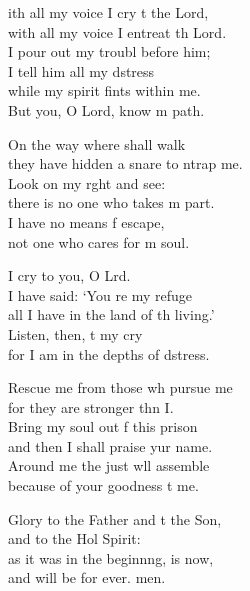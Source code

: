 \settowidth{\versewidth}{With all my voice I cry to the Lord, *}
\begin{psalmverse}%
  \begin{patverse}
ith all my voice I cry t the Lord,\Med\\
    with all my voice I entreat th Lord.\\
I pour out my troubl before him;\Med\\
    I tell him all my d\pointup{\i}stress\\
while my spirit fints within me.\Med\\
    But you, O Lord, know m path.

On the way where  shall walk\Med\\
    they have hidden a snare to ntrap me.\\
Look on my r\pointup{\i}ght and see:\Med\\
    there is no one who takes m part.\\
I have no means f escape,\Med\\
    not one who cares for m soul.

I cry to you, O Lrd.\Flex\\
    I have said: ‘You re my refuge\Med\\
    all I have in the land of th living.’\\
Listen, then, t my cry\Med\\
    for I am in the depths of d\pointup{\i}stress.

Rescue me from those wh pursue me\Med\\
    for they are stronger thn I.\\
Bring my soul out f this prison\Med\\
    and then I shall praise yur name.\\
Around me the just w\pointup{\i}ll assemble\Med\\
    because of your goodness t me.

Glory to the Father and t the Son,\Med\\
    and to the Hol Spirit:\\
as it was in the beginn\pointup{\i}ng, is now,\Med\\
    and will be for ever. men.
  \end{patverse}
\end{psalmverse}
